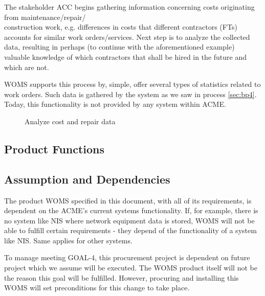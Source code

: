 The stakeholder ACC begins gathering information concerning costs originating from maintenance/repair/\\construction work, e.g. differences in costs that different contractors (FTs) accounts for similar work orders/services.  Next step is to analyze the collected data, resulting in perhaps (to continue with the aforementioned example) valuable knowledge of which contractors that shall be hired in the future and which are not. 

WOMS supports this process by, simple, offer several types of statistics related to work orders. Such data is gathered by the system as we saw in process \ref{sec:bp4}. Today, this functionality is not provided by any system within ACME.
\begin{figure}[H]
	\centering
	\setlength\fboxsep{7pt}
	\setlength\fboxrule{0.5pt}
	\label{fig:analyze}
	\caption{Analyze cost and repair data}
\end{figure}
%
\subsection{Product Functions}

\subsection{Assumption and Dependencies}
\label{sec:assumption_and_dependencies}
The product WOMS specified in this document, with all of its requirements, is dependent on the ACME's current systems functionality. If, for example, there is no system like NIS where network equipment data is stored, WOMS will not be able to fulfill certain requirements - they depend of the functionality of a system like NIS. Same applies for other systems. 

To manage meeting GOAL-4, this procurement project is dependent on future project which we assume will be executed. The WOMS product itself will not be the reason this goal will be fulfilled. However, procuring and installing this WOMS will set preconditions for this change to take place.

